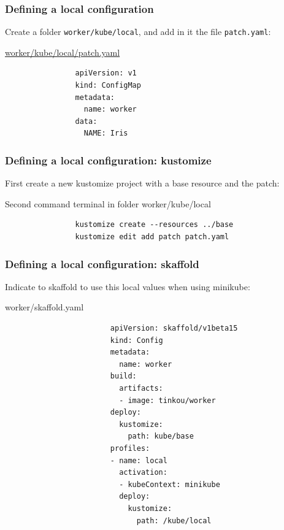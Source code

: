	\begin{frame}[fragile]
		\frametitle{Defining a local configuration}
		
		Create a folder \verb!worker/kube/local!, and add in it the file \verb!patch.yaml!:
		\begin{block}{\href{https://github.com/Tinkou/trainings/blob/master/trainings/sources/dev-onboarding/files/worker/patch.yaml}{worker/kube/local/patch.yaml}}
			\begin{verbatim}
				apiVersion: v1
				kind: ConfigMap
				metadata:
				  name: worker
				data:
				  NAME: Iris
			\end{verbatim}
		\end{block}
		
		\medskip
		
	\end{frame}
	
	\begin{frame}[fragile]
		\frametitle{Defining a local configuration: kustomize}
		
		First create a new kustomize project with a base resource and the patch:
		\begin{block}{Second command terminal in folder worker/kube/local}
			\begin{verbatim}
				kustomize create --resources ../base
				kustomize edit add patch patch.yaml
			\end{verbatim}
		\end{block}
		
	\end{frame}
	
	\begin{frame}[fragile]
		\frametitle{Defining a local configuration: skaffold}
		
		Indicate to skaffold to use this local values when using minikube:
		\begin{block}{worker/skaffold.yaml}
			\begin{tiny}
				\begin{verbatim}
						apiVersion: skaffold/v1beta15
						kind: Config
						metadata:
						  name: worker
						build:
						  artifacts:
						  - image: tinkou/worker
						deploy:
						  kustomize:
						    path: kube/base
						profiles:
						- name: local
						  activation:
						  - kubeContext: minikube
						  deploy:
						    kustomize:
						      path: /kube/local
				\end{verbatim}
			\end{tiny}
		\end{block}
	
	\end{frame}
	
